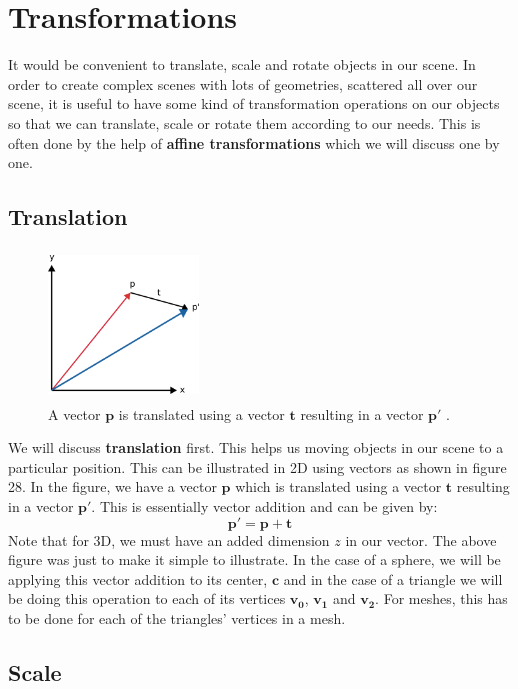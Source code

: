 \documentclass[11pt,a4paper]{article}
\begin{document}
	\section{Transformations}
	It would be convenient to translate, scale and rotate objects in our scene. In order to create complex scenes with lots of geometries, scattered all over our scene, it is useful to have some kind of transformation operations on our objects so that we can translate, scale or rotate them according to our needs. This is often done by the help of \textbf{affine transformations} which we will discuss one by one.
	\subsection{Translation}
	\begin{figure}
		\centering
		\includegraphics[width=4cm, height=4cm]{translation} 
		\caption{A vector $\boldsymbol{p}$ is translated using a vector $\boldsymbol{t}$ resulting in a vector $\boldsymbol{p'}$ \protect\cite{2dtransformations}.}
		\label{fig:scale}
	\end{figure}
	We will discuss \textbf{translation} first. This helps us moving objects in our scene to a particular position. This can be illustrated in 2D using vectors as shown in figure 28.
	\noindent
	In the figure, we have a vector $\boldsymbol{p}$ which is translated using a vector $\boldsymbol{t}$ resulting in a vector $\boldsymbol{p'}$. This is essentially vector addition and can be given by:
	\begin{equation}
	\boldsymbol{p'} = \boldsymbol{p} + \boldsymbol{t}
	\end{equation}
	Note that for 3D, we must have an added dimension $z$ in our vector. The above figure was just to make it simple to illustrate. In the case of a sphere, we will be applying this vector addition to its center, $\boldsymbol{c}$ and in the case of a triangle we will be doing this operation to each of its vertices $\boldsymbol{v_{0}}$, $\boldsymbol{v_{1}}$ and $\boldsymbol{v_{2}}$. For meshes, this has to be done for each of the triangles' vertices in a mesh. 
	\subsection{Scale}
	
\end{document}

